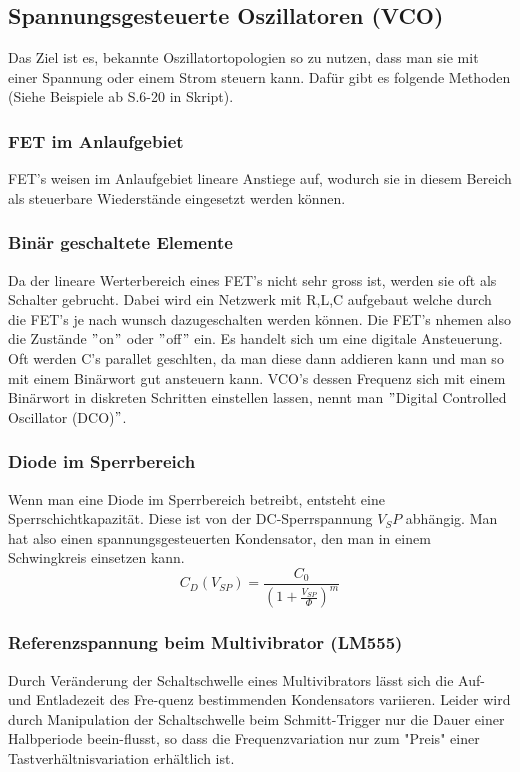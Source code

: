 \FloatBarrier
\subsection{Spannungsgesteuerte Oszillatoren (VCO)}
Das Ziel ist es, bekannte Oszillatortopologien so zu nutzen, dass man sie mit einer Spannung oder einem Strom steuern kann. Dafür gibt es folgende Methoden (Siehe Beispiele ab S.6-20 in Skript).

\FloatBarrier
\subsubsection{FET im Anlaufgebiet}
FET's weisen im Anlaufgebiet lineare Anstiege auf, wodurch sie in diesem Bereich als steuerbare Wiederstände eingesetzt werden können.

\FloatBarrier
\subsubsection{Binär geschaltete Elemente}
Da der lineare Werterbereich eines FET's nicht sehr gross ist, werden sie oft als Schalter gebrucht. Dabei wird ein Netzwerk mit R,L,C aufgebaut welche durch die FET's je nach wunsch dazugeschalten werden können. Die FET's nhemen also die Zustände $"$on$"$ oder $"$off$"$ ein. Es handelt sich um eine digitale Ansteuerung. Oft werden C's parallet geschlten, da man diese dann addieren kann und man so mit einem Binärwort gut ansteuern kann. VCO's dessen Frequenz sich mit einem Binärwort in diskreten Schritten einstellen lassen, nennt man $"$Digital Controlled Oscillator (DCO)$"$.

\FloatBarrier
\subsubsection{Diode im Sperrbereich}
Wenn man eine Diode im Sperrbereich betreibt, entsteht eine Sperrschichtkapazität. Diese ist von der DC-Sperrspannung $V_SP$ abhängig. Man hat also einen spannungsgesteuerten Kondensator, den man in einem Schwingkreis einsetzen kann.
\begin{equation*} 
  C_D(V_{SP})=\frac{C_0}{(1+\frac{V_{SP}}{\Phi})^m}
\end{equation*}

\FloatBarrier
\subsubsection{Referenzspannung beim Multivibrator (LM555)}
Durch Veränderung der Schaltschwelle eines Multivibrators lässt sich die Auf- und Entladezeit des Fre-quenz bestimmenden Kondensators variieren. Leider wird durch Manipulation der Schaltschwelle beim Schmitt-Trigger nur die Dauer einer Halbperiode beein-flusst, so dass die Frequenzvariation nur zum "Preis" einer Tastverhältnisvariation erhältlich ist.


